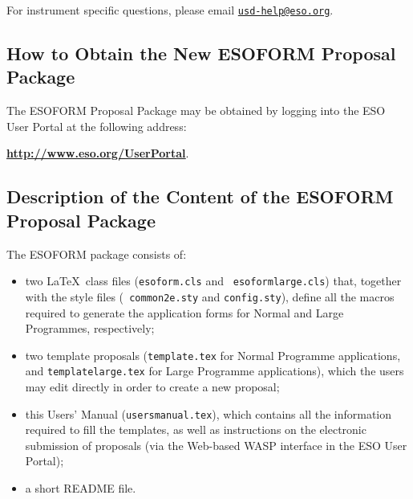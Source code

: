 \documentclass{article}
\begin{document}
For instrument specific questions,
please email \href{mailto:usd-help@eso.org}{\tt usd-help@eso.org}.


\subsection{How to Obtain the {\bf New ESOFORM} Proposal Package}

The ESOFORM Proposal Package may be obtained by logging into the ESO
User Portal at the following address:

\begin{center}
  \href{http://www.eso.org/UserPortal}{\bf
    \underline{http://www.eso.org/UserPortal}}. 
\end{center}


\subsection{Description of the Content of the ESOFORM Proposal
  Package}

\noindent The ESOFORM package consists of:
\begin{itemize}  
\item two \LaTeX\ class files ({\tt esoform.cls} and {\tt
    esoformlarge.cls}) that, together with the style files ({\tt
    common2e.sty}
 and {\tt config.sty}), define
  all the macros required to generate the application forms for
  Normal and Large Programmes, respectively;
\item two template proposals ({\tt  template.tex} for Normal
  Programme applications, and  {\tt templatelarge.tex}  for  Large  Programme 
    applications), which the  users   may  edit directly in  order  to 
    create a new proposal;
\item this Users' Manual ({\tt usersmanual.tex}), which contains all the 
    information  required to fill the templates, as well as
    instructions on the electronic submission of proposals (via the
    Web-based WASP interface in the ESO User Portal);

\item a short README file.
\end{itemize} 

\end{document}

